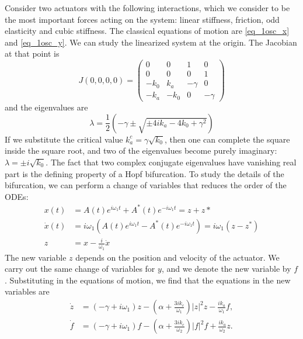 \documentclass[11pt, a4paper]{article} %
\newcommand{\xd}{\dot{x}}
\newcommand{\zd}{\dot{z}}
\newcommand{\w}{\omega}
\begin{document}
Consider two actuators with the following interactions, which we consider to be the 
most important forces acting on the system: 
linear stiffness, friction, odd elasticity and cubic stiffness. The classical equations of motion are 
\eqref{eq_1osc_x} and \eqref{eq_1osc_y}.
We can study the linearized system at the origin. The Jacobian at that point is 
\begin{equation}
    J(0,0,0,0) = \begin{pmatrix}
0 & 0 & 1 & 0 \\
0 & 0 & 0 & 1 \\
-k_0 & k_a & -\gamma & 0 \\
-k_a & -k_0 & 0 & -\gamma
\end{pmatrix}
\end{equation}
and the eigenvalues are 
\begin{equation}
    \lambda = \frac{1}{2}\left(-\gamma \pm \sqrt{\pm 4ik_a - 4k_0 + \gamma^2}\right)
\end{equation}
If we substitute the critical value $k_a^c = \gamma \sqrt{k_0}$, then one can complete the square inside the square root, 
and two of the eigenvalues become purely imaginary: $\lambda = \pm i \sqrt{k_0}$. The fact that two complex conjugate eigenvalues
have vanishing real part is the defining property of a Hopf bifurcation.  
To study the details of the bifurcation, we can perform a change of variables that reduces the order of the ODEs:
\begin{align}
    x(t) &= A(t)e^{i\omega_1 t} + A^*(t)e^{-i\omega_1 t} = z + z* \\
    \xd(t) &= i\omega_1 (A(t)e^{i\omega_1 t} - A^*(t)e^{-i\omega_1 t}) = i\omega_1 (z - z^*) \\
    z &= x - \frac{i}{\omega_1}\xd
\end{align}
The new variable $z$ depends on the position and velocity of the actuator. 
We carry out the same change of variables for $y$, and we denote the new variable by $f$. 
Substituting in the equations of motion, we find that the equations in the new variables are 
\begin{align}
    \zd &= (-\gamma + i\omega_1)z - \left(\alpha + \frac{3ik_c}{\w_1}\right)|z|^2z - \frac{ik_a}{\w_1}f ,\\ %
    \dot{f} &= (-\gamma + i\omega_1)f - \left(\alpha + \frac{3ik_c}{\w_2}\right)|f|^2f + \frac{ik_a}{\w_2}z .
\end{align}
\end{document}
